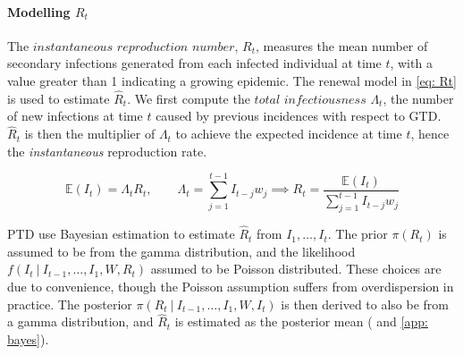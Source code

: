 \documentclass[12pt]{article}
\begin{document}
      \paragraph{Modelling $R_t$} The $\textit{instantaneous reproduction number}$, $R_t$, measures the mean number of secondary infections generated from each
      infected individual at time $t$, 
      with a value greater than 1 indicating a growing epidemic. The renewal model \citep{Fraser2007} 
      in \cref{eq: Rt} is used to estimate $\hat{R}_t$. We first compute the $\textit{total infectiousness } \Lambda_t$, 
      the number of new infections at time $t$ caused by previous incidences with respect to GTD. 
      $\hat{R}_t$ is then the multiplier of $\Lambda_t$ to achieve the expected incidence at time $t$, hence the 
      \textit{instantaneous} reproduction rate. 

      \begin{equation} \label{eq: Rt}
        \mathbb{E}(I_t) = \Lambda_t R_t, \qquad \Lambda_t = \sum_{j = 1}^{t - 1} I_{t - j} w_j \implies R_t =
         \frac{\mathbb{E}(I_t)}{\sum_{j = 1}^{t - 1} I_{t - j} w_j}
      \end{equation}

      PTD use Bayesian estimation to estimate $\hat{R}_t$ from $I_1,\dots,I_t$. The prior $\pi(R_t)$ is assumed to be from
      the gamma distribution, and the likelihood $f(I_t \ | \ I_{t-1},\dots,I_1, W, R_t)$ assumed to be Poisson distributed. 
      These choices are due to convenience, though the Poisson assumption suffers from overdispersion in practice.
      The posterior $\pi(R_t \ | \ I_{t-1},\dots,I_1, W, I_t)$ is then derived to also be from a gamma distribution, 
      and $\hat{R}_t$ is estimated as the posterior mean (\citep{Cori2013} and \cref{app: bayes}).
\end{document}
